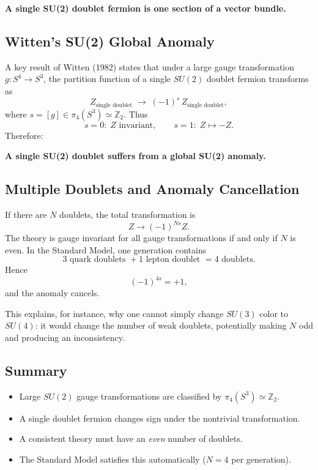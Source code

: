 \documentclass[12pt]{article}
\begin{document}
\medskip
\centerline{\textbf{A single SU(2) doublet fermion is one section of a vector bundle.}}
\medskip

\subsection{Witten's SU(2) Global Anomaly}

A key result of Witten (1982) states that under a large gauge transformation
$g:S^4\to S^3$, the partition function of a single $SU(2)$ doublet fermion transforms as
\[
Z_{\text{single doublet}} \;\longrightarrow\; (-1)^s\, Z_{\text{single doublet}},
\]
where $s=[g]\in \pi_4(S^3)\simeq\mathbb{Z}_2$. Thus
\[
s=0:\; Z \text{ invariant},\qquad 
s=1:\; Z\mapsto -Z.
\]
Therefore:

\medskip
\centerline{\textbf{A single SU(2) doublet suffers from a global SU(2) anomaly.}}
\medskip

\subsection{Multiple Doublets and Anomaly Cancellation}

If there are $N$ doublets, the total transformation is
\[
Z \longrightarrow (-1)^{Ns} Z.
\]
The theory is gauge invariant for all gauge transformations if and only if $N$ is even.
In the Standard Model, one generation contains
\[
3 \text{ quark doublets } + 1 \text{ lepton doublet } = 4 \text{ doublets}.
\]
Hence
\[
(-1)^{4s} = +1,
\]
and the anomaly cancels.

This explains, for instance, why one cannot simply change $SU(3)$ color to $SU(4)$:
it would change the number of weak doublets, potentially making $N$ odd and producing
an inconsistency.

\subsection{Summary}

\begin{itemize}
    \item Large $SU(2)$ gauge transformations are classified by $\pi_4(S^3)\simeq\mathbb{Z}_2$.
    \item A single doublet fermion changes sign under the nontrivial transformation.
    \item A consistent theory must have an \emph{even} number of doublets.
    \item The Standard Model satisfies this automatically ($N=4$ per generation).
\end{itemize}
\end{document}
